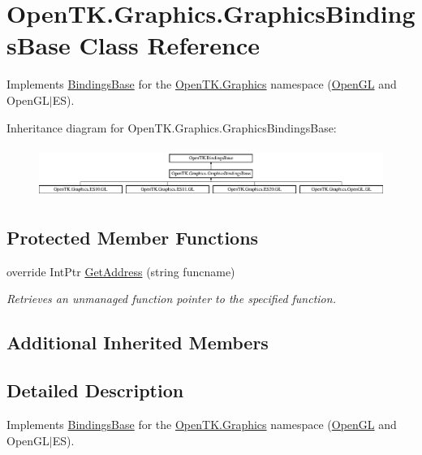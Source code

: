 \hypertarget{class_open_t_k_1_1_graphics_1_1_graphics_bindings_base}{\section{Open\-T\-K.\-Graphics.\-Graphics\-Bindings\-Base Class Reference}
\label{class_open_t_k_1_1_graphics_1_1_graphics_bindings_base}
}


Implements \hyperlink{class_open_t_k_1_1_bindings_base}{Bindings\-Base} for the \hyperlink{namespace_open_t_k_1_1_graphics}{Open\-T\-K.\-Graphics} namespace (\hyperlink{namespace_open_t_k_1_1_graphics_1_1_open_g_l}{Open\-G\-L} and Open\-G\-L$|$\-E\-S).  


Inheritance diagram for Open\-T\-K.\-Graphics.\-Graphics\-Bindings\-Base\-:\begin{figure}[H]
\begin{center}
\leavevmode
\includegraphics[height=1.666667cm]{class_open_t_k_1_1_graphics_1_1_graphics_bindings_base}
\end{center}
\end{figure}
\subsection*{Protected Member Functions}
\begin{DoxyCompactItemize}
\item 
override Int\-Ptr \hyperlink{class_open_t_k_1_1_graphics_1_1_graphics_bindings_base_aeb37d851aee841ad85ef90242456d652}{Get\-Address} (string funcname)
\begin{DoxyCompactList}\small\item\em Retrieves an unmanaged function pointer to the specified function. \end{DoxyCompactList}\end{DoxyCompactItemize}
\subsection*{Additional Inherited Members}


\subsection{Detailed Description}
Implements \hyperlink{class_open_t_k_1_1_bindings_base}{Bindings\-Base} for the \hyperlink{namespace_open_t_k_1_1_graphics}{Open\-T\-K.\-Graphics} namespace (\hyperlink{namespace_open_t_k_1_1_graphics_1_1_open_g_l}{Open\-G\-L} and Open\-G\-L$|$\-E\-S). 




